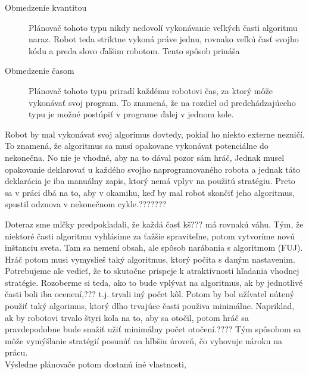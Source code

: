 \begin{description}
\item [Obmedzenie kvantitou] \hfill \newline
Plánovač tohoto typu nikdy nedovolí vykonávanie veľkých časti algoritmu naraz. Robot teda striktne vykoná práve jednu, rovnako veľkú  časť svojho kódu a preda slovo ďalšim robotom. Tento spôsob prináša 
\item [Obmedzenie časom] \hfill \newline
Plánovač tohoto typu priradí každému robotovi čas, za ktorý môže vykonávať svoj program. To znamená, že na rozdiel od predchádzajúceho typu je možné postúpiť v programe ďalej v jednom kole.
\end{description} 

Robot by mal vykonávat svoj algorimus dovtedy, pokiaľ ho niekto externe nezničí. To znamená, že algoritmus sa musí opakovane vykonávat potenciálne do nekonečna. No nie je vhodné, aby na to dával pozor sám hráč, Jednak musel opakovanie deklarovať u každého svojho naprogramovaného robota a jednak táto deklarácia je iba manuálny zapis, ktorý nemá vplyv na použitú stratégiu. Preto sa v práci dbá na to, aby v okamihu, keď by mal robot  skončiť  jeho algoritmus, spustil odznova v nekonečnom cykle.???????

Doteraz sme mlčky predpokladali, že každá časť kš??? má rovnakú váhu. Tým, že niektoré časti algoritmu vyhlásime za ťažšie spraviteľne, potom vytvoríme novú inštanciu sveta. Tam sa nemení obsah, ale spôsob narábania s algoritmom (FUJ). Hráč potom musi vymyslieš taký algoritmus, ktorý počita s daným nastavenim. \\
Potrebujeme ale vedieť, že to skutočne prispeje k atraktívnosti hľadania vhodnej stratégie. Rozoberme si teda, ako to bude vplývat na algoritmus, ak by jednotlivé časti boli iba  ocenení,??? t.j. trvali iný počet kôl. Potom by bol užívatel nútený použiť taký algorimus, ktorý dlho trvajúce časti použiva minimálne. Napriklad, ak by robotovi trvalo štyri kola na to, aby sa otočil, potom hráč sa pravdepodobne bude snažiť užiť minimálny počet otočení.???? 
Tým spôsobom sa môže vymýšlanie stratégií posunúť na hlbšiu úroveň, čo vyhovuje nároku na prácu.\\%
Výsledne plánovače potom dostanú iné vlastnosti, 
